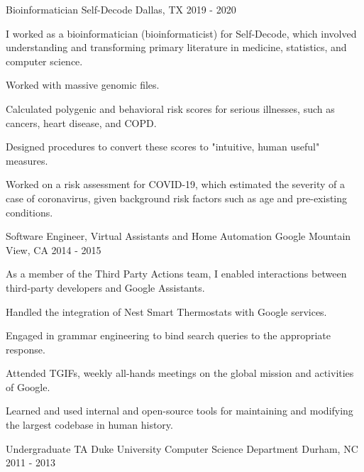 \begin{cventries}
{\begin{cvparagraph}
            \end{cvparagraph}
        }
    \cventry
        {Bioinformatician}
        {Self-Decode}
        {Dallas, TX}
        {2019 - 2020}
        {
            \begin{cvparagraph}
            I worked as a bioinformatician (bioinformaticist) for Self-Decode, which involved understanding and transforming primary literature in medicine, statistics, and computer science. 
            \end{cvparagraph}
            \begin{cvitems}
                \item{Worked with massive genomic files.}
                \item{Calculated polygenic and behavioral risk scores for serious illnesses, such as cancers, heart disease, and COPD.}
                \item{Designed procedures to convert these scores to "intuitive, human useful" measures.}
                \item{Worked on a risk assessment for COVID-19, which estimated the severity of a case of coronavirus, given background risk factors such as age and pre-existing conditions.}
            \end{cvitems}
        }
    \cventry
        {Software Engineer, Virtual Assistants and Home Automation}
        {Google}
        {Mountain View, CA}
        {2014 - 2015}
        {
        \begin{cvparagraph}
            As a member of the Third Party Actions team, I enabled interactions between third-party developers and Google Assistants.
         \end{cvparagraph}
	    \begin{cvitems}
            \item{Handled the integration of Nest Smart Thermostats with Google services.}
            \item{Engaged in grammar engineering to bind search queries to the appropriate response.}
            \item{Attended TGIFs, weekly all-hands meetings on the global mission and activities of Google.}
            \item{Learned and used internal and open-source tools for maintaining and modifying the largest codebase in human history.}
        \end{cvitems}
        }
    \cventry
        {Undergraduate TA}
        {Duke University Computer Science Department}
        {Durham, NC}
        {2011 - 2013}

\end{cventries}
